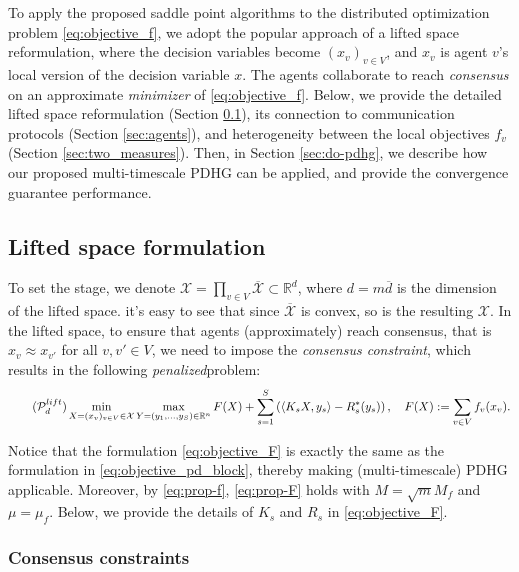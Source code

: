\documentclass[10pt]{article}
\newcommand{\mc}{\mathcal}
\newcommand{\R}{\mathbb{R}}
\begin{document}
To apply the proposed saddle point algorithms to the distributed optimization problem \eqref{eq:objective_f}, we adopt the popular approach of a lifted space reformulation\cite{lan_communication-efficient_2020,stephen_distributed_2011}, where the decision variables become $(x_v)_{v\in V}$, and $x_v$ is agent $v$'s local version of the decision variable $x$. The agents collaborate to reach \textit{consensus} on an approximate \textit{minimizer} of \eqref{eq:objective_f}. Below, we provide the detailed lifted space reformulation (Section \ref{sec:do-setup}), its connection to communication protocols (Section \ref{sec:agents}), and heterogeneity between the local objectives $f_v$ (Section \ref{sec:two_measures}). Then, in Section \ref{sec:do-pdhg}, we describe how our proposed multi-timescale PDHG can be applied, and provide the convergence guarantee performance.



\subsection{Lifted space formulation}\label{sec:do-setup}
To set the stage, we denote $\mc X = \prod_{v\in V} \overline{\mc X}\subset \R^{d}$, where $d = m\overline{d}$ is the dimension of the lifted space. it's easy to see that since $\overline{\mc X}$ is convex, so is the resulting $\mc X$. In the lifted space, to ensure that agents (approximately) reach consensus, that is $x_v\approx x_{v'}$ for all $v,v'\in V$, we need to impose the \textit{consensus constraint}, which results in the following \textit{penalized}problem: 
\begin{equation}\label{eq:objective_F}\tag{$\mc P_{d}^{lift}$}
    \min_{X=(x_v)_{v\in V}\in {\mc X}}\max_{Y = (y_1,\ldots,y_S)\in \R^n} F(X) + \sum_{s=1}^S \left(\langle K_sX,y_s\rangle - R^*_s(y_s)\right),\quad F(X):=\sum_{v\in V} f_v(x_v).
\end{equation}

Notice that the formulation \eqref{eq:objective_F} is exactly the same as the formulation in \eqref{eq:objective_pd_block}, thereby making (multi-timescale) PDHG applicable. Moreover, by \eqref{eq:prop-f}, \eqref{eq:prop-F} holds with $M = \sqrt{m}M_f$ and $\mu = \mu_f$. Below, we provide the details of $K_s$ and $R_s$ in \eqref{eq:objective_F}. 



\subsubsection{Consensus constraints} 
\end{document}
